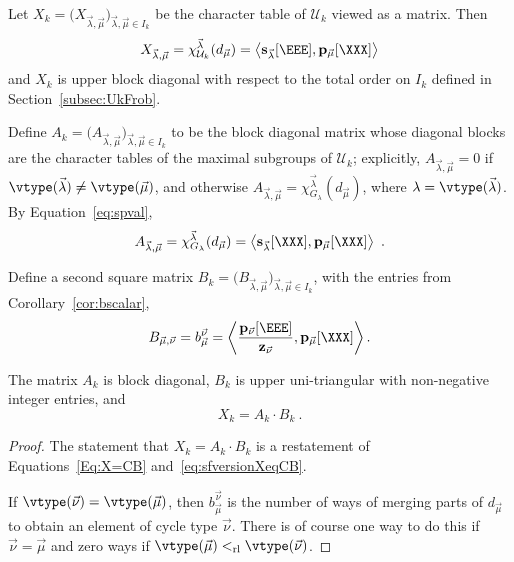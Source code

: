 \begin{prop} \label{prop:matrixX}
Let $X_k = \big( X_{ \vec{\lambda}, \vec{\mu}} \big)_{\vec{\lambda}, \vec{\mu}\in I_k}$
be the character table of $\mathcal{U}_k$ viewed as a matrix. Then
\[
X_{ \vec{\lambda}, \vec{\mu}} =
\chi^{\vec{\lambda}}_{\mathcal{U}_k}(d_{\vec{\mu}})
= \left< \mathbf{s}_{\vec{\lambda}}[\EEE], \mathbf{p}_{\vec{\mu}}[\XXX] \right>
\]
and $X_k$ is upper block diagonal with respect to the total order on $I_k$
defined in Section~\ref{subsec:UkFrob}.
\end{prop}

Define $A_k= \big( A_{ \vec{\lambda}, \vec{\mu}} \big)_{\vec{\lambda}, \vec{\mu}\in I_k}$
to be the block diagonal matrix whose diagonal blocks are the character
tables of the maximal subgroups of $\mathcal{U}_k$;
explicitly,
$A_{\vec{\lambda}, \vec{\mu}} = 0$ if $\vtype(\vec{\lambda}) \neq \vtype(\vec{\mu})$,
and otherwise
$A_{\vec{\lambda}, \vec{\mu}} = \chi^{\vec{\lambda}}_{G_\lambda}(d_{\vec{\mu}})$,
where $\lambda = \vtype(\vec{\lambda})$.
By Equation~\eqref{eq:spval},
\[
A_{\vec{\lambda}, \vec{\mu}} = \chi^{\vec{\lambda}}_{G_\lambda}( d_{\vec{\mu}} )
= \left< \mathbf{s}_{\vec{\lambda}}[\XXX], \mathbf{p}_{\vec{\mu}}[\XXX] \right>~.
\]

Define a second square matrix $B_k  = \big( B_{ \vec{\lambda}, \vec{\mu}} \big)_{\vec{\lambda}, \vec{\mu}\in I_k}$, with the entries from Corollary~\ref{cor:bscalar},
\[
B_{\vec{\mu},\vec{\nu}} = b_{\vec{\mu}}^{\vec{\nu}} =
\left< \frac{\mathbf{p}_{\vec{\nu}}[\EEE]}{\mathbf{z}_{\vec{\nu}}},
\mathbf{p}_{\vec{\mu}}[\XXX]\right>.
\]

\begin{prop}\label{prop:matrixAB}
The matrix $A_k$ is block diagonal,
$B_k$ is upper uni-triangular
with non-negative integer entries, and
\[
X_k = A_k \cdot B_k~.
\]
\end{prop}
\begin{proof}
The statement that
$X_k = A_k \cdot B_k$ is a restatement of Equations~\eqref{Eq:X=CB} and~\eqref{eq:sfversionXeqCB}.

If $\vtype(\vec{\nu}) = \vtype(\vec{\mu})$, then
$b_{\vec{\mu}}^{\vec{\nu}}$ is the number of ways
of merging parts of $d_{\vec{\mu}}$ to obtain an element
of cycle type $\vec{\nu}$.  There is of course one way to do this
if $\vec{\nu} = \vec{\mu}$ and zero ways
if $\vtype(\vec{\mu}) <_{\mathrm{rl}} \vtype(\vec{\nu})$.
\end{proof}

